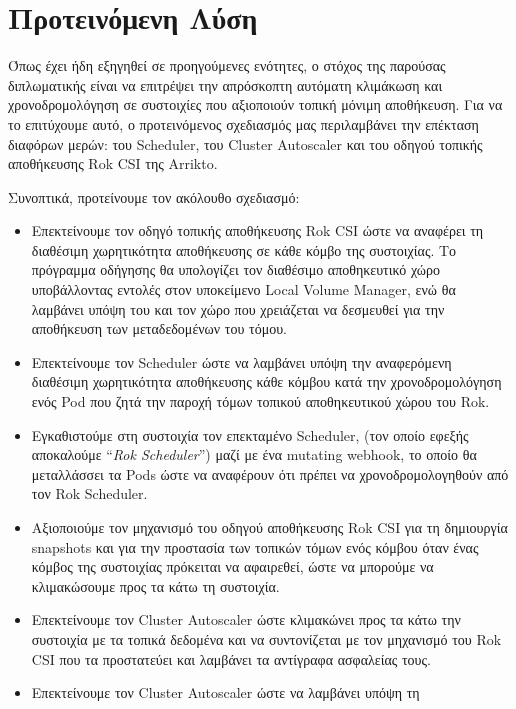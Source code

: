 \section{Προτεινόμενη Λύση} \label{section:gr-intro_proposed_solution}

Όπως έχει ήδη εξηγηθεί σε προηγούμενες ενότητες, ο στόχος της παρούσας
διπλωματικής είναι να επιτρέψει την απρόσκοπτη αυτόματη κλιμάκωση και
χρονοδρομολόγηση σε συστοιχίες που αξιοποιούν τοπική μόνιμη αποθήκευση. Για να
το επιτύχουμε αυτό, ο προτεινόμενος σχεδιασμός μας περιλαμβάνει την επέκταση
διαφόρων μερών: του Scheduler, του Cluster Autoscaler και του οδηγού τοπικής
αποθήκευσης Rok CSI της Arrikto.

Συνοπτικά, προτείνουμε τον ακόλουθο σχεδιασμό:
\begin{itemize}
      \item Επεκτείνουμε τον οδηγό τοπικής αποθήκευσης Rok CSI ώστε να αναφέρει
            τη διαθέσιμη χωρητικότητα αποθήκευσης σε κάθε κόμβο της συστοιχίας.
            Το πρόγραμμα οδήγησης θα υπολογίζει τον διαθέσιμο αποθηκευτικό χώρο
            υποβάλλοντας εντολές στον υποκείμενο Local Volume Manager, ενώ θα
            λαμβάνει υπόψη του και τον χώρο που χρειάζεται να δεσμευθεί για την
            αποθήκευση των μεταδεδομένων του τόμου.
      \item Επεκτείνουμε τον Scheduler ώστε να λαμβάνει υπόψη την αναφερόμενη
            διαθέσιμη χωρητικότητα αποθήκευσης κάθε κόμβου κατά την
            χρονοδρομολόγηση ενός Pod που ζητά την παροχή τόμων τοπικού
            αποθηκευτικού χώρου του Rok.
      \item Εγκαθιστούμε στη συστοιχία τον επεκταμένο Scheduler, (τον οποίο
            εφεξής αποκαλούμε ``\textit{Rok Scheduler}'') μαζί με ένα mutating
            webhook, το οποίο θα μεταλλάσσει τα Pods ώστε να αναφέρουν ότι
            πρέπει να χρονοδρομολογηθούν από τον Rok Scheduler.
      \item Αξιοποιούμε τον μηχανισμό του οδηγού αποθήκευσης Rok CSI για τη
            δημιουργία snapshots και για την προστασία των τοπικών τόμων ενός
            κόμβου όταν ένας κόμβος της συστοιχίας πρόκειται να αφαιρεθεί, ώστε
            να μπορούμε να κλιμακώσουμε προς τα κάτω τη συστοιχία.
      \item Επεκτείνουμε τον Cluster Autoscaler ώστε κλιμακώνει προς τα κάτω την
            συστοιχία με τα τοπικά δεδομένα και να συντονίζεται με τον
            μηχανισμό του Rok CSI που τα προστατεύει και λαμβάνει τα αντίγραφα
            ασφαλείας τους.
      \item Επεκτείνουμε τον Cluster Autoscaler ώστε να λαμβάνει υπόψη τη

\end{itemize}

